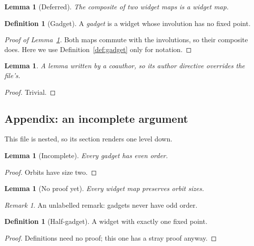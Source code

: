 \documentclass{amsart}
\theoremstyle{plain}
\newtheorem{lemma}[theorem]{Lemma}
\theoremstyle{definition}
\newtheorem{definition}[theorem]{Definition}
\theoremstyle{remark}
\newtheorem{remark}[theorem]{Remark}
\begin{document}

\begin{lemma}[Deferred]\label{sy-0007}
The composite of two widget maps is a widget map.
\end{lemma}


\begin{definition}[Gadget]\label{sy-0008}\label{def:gadget}\label{defn:gadget-old}
A \emph{gadget} is a widget whose involution has no fixed point.
\end{definition}


\begin{proof}[Proof of Lemma~\ref{sy-0007}]
Both maps commute with the involutions, so their composite does. Here we use Definition~\ref{def:gadget} only for notation.
\end{proof}

\begin{lemma}\label{sy-0202}
A lemma written by a coauthor, so its author directive overrides the file's.
\end{lemma}
\begin{proof}
Trivial.
\end{proof}


\subsection{Appendix: an incomplete argument}\label{sy-0300}

This file is nested, so its section renders one level down.

\begin{lemma}[Incomplete]\label{sy-000C}
Every gadget has even order.
\end{lemma}
\begin{proof}
Orbits have size two. 
\end{proof}

\begin{lemma}[No proof yet]\label{sy-000D}
Every widget map preserves orbit sizes.
\end{lemma}

\begin{remark}
An unlabelled remark: gadgets never have odd order.
\end{remark}

\begin{definition}[Half-gadget]\label{sy-000E}
A widget with exactly one fixed point.
\end{definition}
\begin{proof}
Definitions need no proof; this one has a stray proof anyway.
\end{proof}
\end{document}
